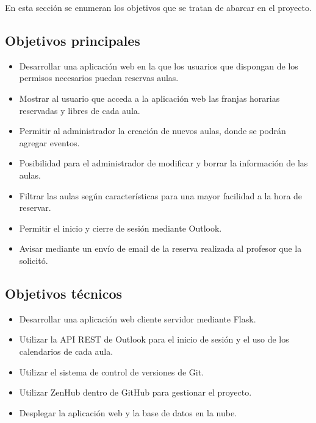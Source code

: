 
En esta sección se enumeran los objetivos que se tratan de abarcar en el proyecto.

\subsection{Objetivos principales}

\begin{itemize}
	\item Desarrollar una aplicación web en la que los usuarios que dispongan de los permisos necesarios puedan reservas aulas.
	\item Mostrar al usuario que acceda a la aplicación web las franjas horarias reservadas y libres de cada aula.
	\item Permitir al administrador la creación de nuevos aulas, donde se podrán agregar eventos.
	\item Posibilidad para el administrador de modificar y borrar la información de las aulas.
	\item Filtrar las aulas según características para una mayor facilidad a la hora de reservar.
	\item Permitir el inicio y cierre de sesión mediante Outlook.
	\item Avisar mediante un envío de email de la reserva realizada al profesor que la solicitó.
\end{itemize}

\subsection{Objetivos técnicos}
\begin{itemize}
	\item Desarrollar una aplicación web cliente servidor mediante Flask.
	\item Utilizar la API REST de Outlook para el inicio de sesión y el uso de los calendarios de cada aula.
	\item Utilizar el sistema de control de versiones de Git.
	\item Utilizar ZenHub dentro de GitHub para gestionar el proyecto.
	\item Desplegar la aplicación web y la base de datos en la nube.
\end{itemize}
